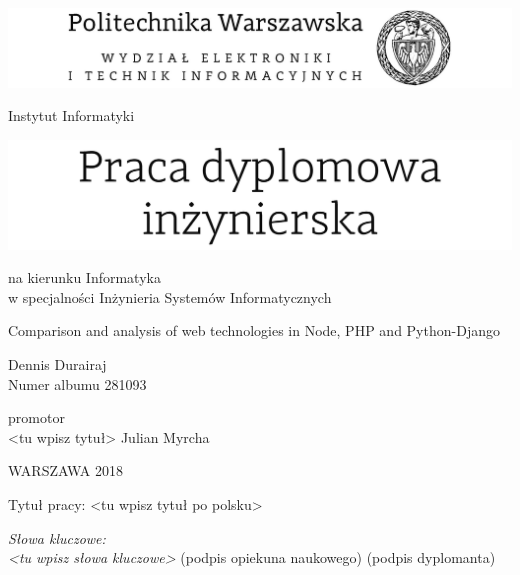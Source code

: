 


\thispagestyle{empty}
\center
\includegraphics[scale=1]{PolitechnikaWarszawska}

\vspace{12mm}

\normalsize
Instytut Informatyki


\center
\includegraphics[scale=1]{PracaDyplomowa}

\vspace{12mm}

\normalsize
na kierunku Informatyka \\ 
w specjalności Inżynieria Systemów Informatycznych \\

\vspace{15mm}

\Large 
Comparison and analysis of web technologies in Node, PHP and Python-Django \\ 

\vspace{17mm}

\huge 
Dennis Durairaj  \\ 
\normalsize 
Numer albumu 281093  \\ 

\vspace{17mm}

promotor \\
<tu wpisz tytuł> Julian Myrcha  \\

\vspace{7mm}

WARSZAWA 2018 

\newpage
\thispagestyle{empty}
\phantom{Nothing here}
\newpage
\clearpage
\phantom{Here neither}

\setcounter{page}{3}
\vspace{-1.5cm}
\begin{flushleft}
	Tytuł pracy: <tu wpisz tytuł po polsku> 
\end{flushleft}
\vspace{0.5cm}
\vspace{0.5cm}
\noindent \textit{Słowa kluczowe: \\ <tu wpisz słowa kluczowe>} 
\vfill
(podpis opiekuna naukowego) \hfill (podpis dyplomanta)

